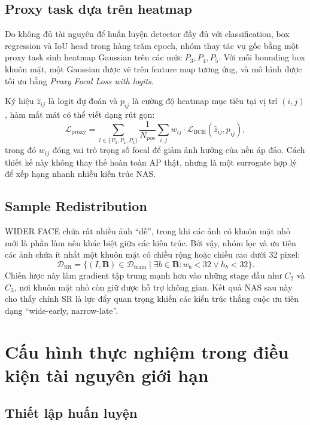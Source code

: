 \section{Proxy task dựa trên heatmap}

Do không đủ tài nguyên để huấn luyện detector đầy đủ với classification, box regression và IoU head trong hàng trăm epoch, nhóm thay tác vụ gốc bằng một proxy task sinh heatmap Gaussian trên các mức \(P_3, P_4, P_5\). Với mỗi bounding box khuôn mặt, một Gaussian được vẽ trên feature map tương ứng, và mô hình được tối ưu bằng \textit{Proxy Focal Loss with logits}. \cite{lin2017focal}

Ký hiệu \(\hat{z}_{ij}\) là logit dự đoán và \(p_{ij}\) là cường độ heatmap mục tiêu tại vị trí \((i, j)\), hàm mất mát có thể viết dạng rút gọn:
\[
\mathcal{L}_{\text{proxy}} = \sum_{l \in \{P_3,P_4,P_5\}}
\frac{1}{N_{\text{pos}}}
\sum_{i,j}
w_{ij} \cdot \mathcal{L}_{\text{BCE}}(\hat{z}_{ij}, p_{ij}),
\]
trong đó \(w_{ij}\) đóng vai trò trọng số focal để giảm ảnh hưởng của nền áp đảo. Cách thiết kế này không thay thế hoàn toàn AP thật, nhưng là một surrogate hợp lý để xếp hạng nhanh nhiều kiến trúc NAS.

\section{Sample Redistribution}

WIDER FACE chứa rất nhiều ảnh ``dễ'', trong khi các ảnh có khuôn mặt nhỏ mới là phần làm nên khác biệt giữa các kiến trúc. Bởi vậy, nhóm lọc và ưu tiên các ảnh chứa ít nhất một khuôn mặt có chiều rộng hoặc chiều cao dưới 32 pixel:
\[
\mathcal{D}_{\text{SR}} =
\{(I,\mathbf{B}) \in \mathcal{D}_{\text{train}} \mid
\exists b \in \mathbf{B}: w_b < 32 \lor h_b < 32 \}.
\]
Chiến lược này làm gradient tập trung mạnh hơn vào những stage đầu như \(C_2\) và \(C_3\), nơi khuôn mặt nhỏ còn giữ được hỗ trợ không gian. Kết quả NAS sau này cho thấy chính SR là lực đẩy quan trọng khiến các kiến trúc thắng cuộc ưu tiên dạng ``wide-early, narrow-late''.

\chapter{Cấu hình thực nghiệm trong điều kiện tài nguyên giới hạn}

\section{Thiết lập huấn luyện}

